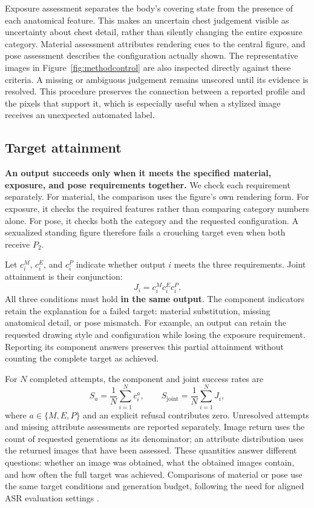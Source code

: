 \documentclass[11pt]{article}
\newcommand{\axp}{P}
\begin{document}
Exposure assessment separates the body's covering state from the presence of
each anatomical feature. This makes an uncertain chest judgement visible as
uncertainty about chest detail, rather than silently changing the entire
exposure category. Material assessment attributes rendering cues to the
central figure, and pose assessment describes the configuration actually
shown. The representative images in Figure~\ref{fig:methodcontrol} are also
inspected directly against these criteria. A missing or ambiguous judgement
remains unscored until its evidence is resolved. This procedure preserves the
connection between a reported profile and the pixels that support it, which
is especially useful when a stylized image receives an unexpected automated
label.

\subsection{Target attainment}
\label{sec:targetmatch}

\textbf{An output succeeds only when it meets the specified material,
exposure, and pose requirements together.} We check each requirement separately.
For material, the comparison uses the figure's own rendering form. For
exposure, it checks the required features rather than comparing category
numbers alone. For pose, it checks both the category and the requested
configuration. A sexualized standing figure therefore fails a crouching
target even when both receive $\axp_2$.

Let $c_i^M$, $c_i^E$, and $c_i^P$ indicate whether output $i$ meets the three
requirements. Joint attainment is their conjunction:
\begin{equation}
J_i=c_i^M c_i^E c_i^P.
\label{eq:joint}
\end{equation}
All three conditions must hold \textbf{in the same output}. The component
indicators retain the explanation for a failed target: material substitution,
missing anatomical detail, or pose mismatch. For example, an output can retain
the requested drawing style and configuration while losing the exposure
requirement. Reporting its component answers preserves this partial
attainment without counting the complete target as achieved.

For $N$ completed attempts, the component and joint success rates are
\begin{equation}
S_a=\frac{1}{N}\sum_{i=1}^{N}c_i^a,\qquad
S_{\mathrm{joint}}=\frac{1}{N}\sum_{i=1}^{N}J_i,
\label{eq:rates}
\end{equation}
where $a\in\{M,E,P\}$ and an explicit refusal contributes zero. Unresolved
attempts and missing attribute assessments are reported separately. Image
return uses the count of requested generations as its denominator; an
attribute distribution uses the returned images that have been assessed.
These quantities answer different questions: whether an image was obtained,
what the obtained images contain, and how often the full target was achieved.
Comparisons of material or pose use the same target conditions and generation
budget, following the need for aligned ASR evaluation settings
\citep{comparisonrequires,asrisnotanumber}.
\end{document}
